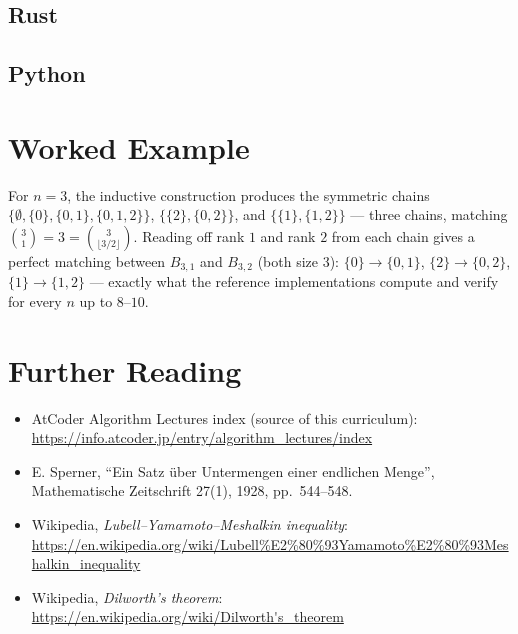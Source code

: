 \documentclass[11pt]{article}
\begin{document}
\subsection{Rust}

\subsection{Python}

\section{Worked Example}
\begin{examplebox}
For $n=3$, the inductive construction produces the symmetric chains
$\{\emptyset,\{0\},\{0,1\},\{0,1,2\}\}$, $\{\{2\},\{0,2\}\}$, and
$\{\{1\},\{1,2\}\}$ --- three chains, matching
$\binom{3}{1}=3=\binom{3}{\lfloor 3/2\rfloor}$. Reading off rank $1$ and
rank $2$ from each chain gives a perfect matching between $B_{3,1}$ and
$B_{3,2}$ (both size $3$): $\{0\}\!\to\!\{0,1\}$, $\{2\}\!\to\!\{0,2\}$,
$\{1\}\!\to\!\{1,2\}$ --- exactly what the reference implementations
compute and verify for every $n$ up to $8$--$10$.
\end{examplebox}

\section{Further Reading}
\begin{itemize}[leftmargin=1.5em]
  \item AtCoder Algorithm Lectures index (source of this curriculum):
        \url{https://info.atcoder.jp/entry/algorithm_lectures/index}
  \item E. Sperner, ``Ein Satz über Untermengen einer endlichen Menge'',
        Mathematische Zeitschrift 27(1), 1928, pp.\ 544--548.
  \item Wikipedia, \emph{Lubell--Yamamoto--Meshalkin inequality}:
        \url{https://en.wikipedia.org/wiki/Lubell\%E2\%80\%93Yamamoto\%E2\%80\%93Meshalkin_inequality}
  \item Wikipedia, \emph{Dilworth's theorem}:
        \url{https://en.wikipedia.org/wiki/Dilworth's_theorem}
\end{itemize}
\end{document}
